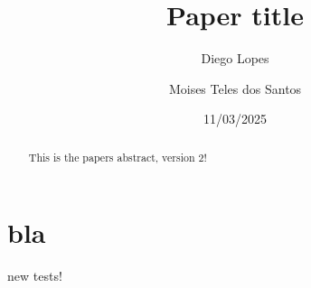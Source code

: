 \documentclass[a4paper, titlepage]{article}
\begin{document}
\title{Paper title}
\author{
	Diego Lopes\\
	\and
	Moises Teles dos Santos}
\date{11/03/2025}
\maketitle

\begin{abstract}
	This is the papers abstract, version 2!
\end{abstract}

\section{bla}
new tests! \cite{amini_modified_2015}






\printbibliography{}
\end{document}
